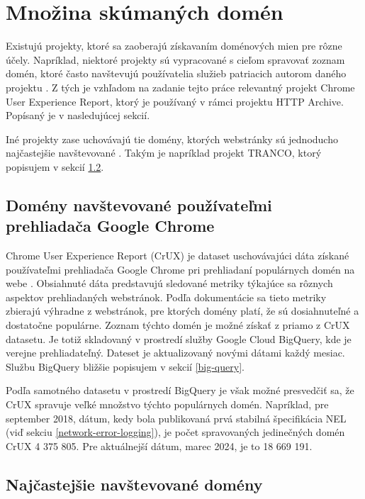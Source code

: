 \pagebreak

\section{Množina skúmaných domén}

Existujú projekty, ktoré sa zaoberajú získavaním doménových mien pre rôzne účely.
Napríklad, niektoré projekty sú vypracované s cieľom spravovať zoznam domén, ktoré často navštevujú používatelia služieb patriacich autorom daného projektu \cite{chrome-crux}. 
Z tých je vzhľadom na zadanie tejto práce relevantný projekt Chrome User Experience Report, ktorý je používaný v rámci projektu HTTP Archive. 
Popísaný je v nasledujúcej sekcií.

Iné projekty zase uchovávajú tie domény, ktorých webstránky sú jednoducho najčastejšie navštevované \cite{hacker-target-website-lists-overview, tranco}.
Takým je napríklad projekt TRANCO, ktorý popisujem v sekcií \ref{tranco}.

\subsection{Domény navštevované používateľmi prehliadača Google Chrome}
\label{chrome-user-experience-report}

Chrome User Experience Report (CrUX) je dataset uschovávajúci dáta získané používateľmi prehliadača Google Chrome pri prehliadaní populárnych domén na webe \cite{chrome-crux}.
Obsiahnuté dáta predstavujú sledované metriky týkajúce sa rôznych aspektov prehliadaných webstránok.
Podľa dokumentácie sa tieto metriky zbierajú výhradne z webstránok, pre ktorých domény platí, že sú dosiahnuteľné a dostatočne populárne.
Zoznam týchto domén je možné získať z priamo z CrUX datasetu.
Je totiž skladovaný v prostredí služby Google Cloud BigQuery, kde je verejne prehliadateľný. 
Dateset je aktualizovaný novými dátami každý mesiac.
Službu BigQuery bližšie popisujem v sekcií \ref{big-query}.

Podľa samotného datasetu v prostredí BigQuery je však možné presvedčiť sa, že CrUX spravuje veľké množstvo týchto populárnych domén.
Napríklad, pre september 2018, dátum, kedy bola publikovaná prvá stabilná špecifikácia NEL (viď sekciu \ref{network-error-logging}), je počet spravovaných jedinečných domén CrUX 4 375 805.
Pre aktuálnejší dátum, marec 2024, je to 18 669 191.


\subsection{Najčastejšie navštevované domény}
\label{tranco}

